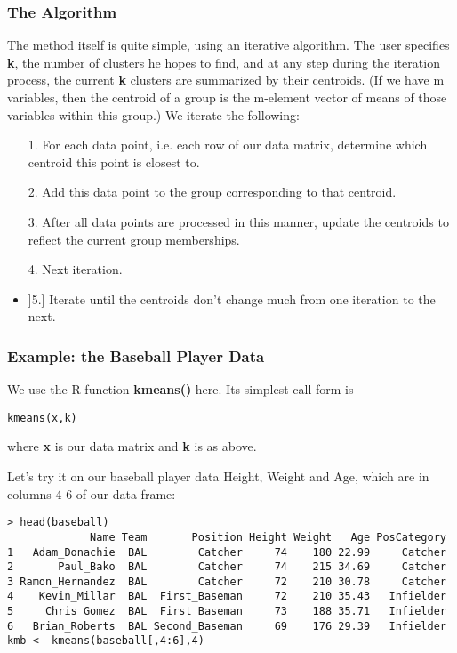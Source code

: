\subsubsection{The Algorithm}

The method itself is quite simple, using an iterative algorithm.  The
user specifies {\bf k}, the number of clusters he hopes to find, and at
any step during the iteration process, the current {\bf k} clusters are
summarized by their centroids.  (If we have m variables, then the
centroid of a group is the m-element vector of means of those variables
within this group.)  We iterate the following:

\begin{itemize}

\item [1.]  For each data point, i.e. each row of our data matrix,
determine which centroid this point is closest to.

\item [2.]  Add this data point to the group corresponding to that
centroid.

\item [3.]  After all data points are processed in this manner, update
the centroids to reflect the current group memberships.

\item [4.]  Next iteration.

\item ]5.]  Iterate until the centroids don't change much from one
iteration to the next.

\end{itemize}

\subsubsection{Example:  the Baseball Player Data}

We use the R function {\bf kmeans()} here.  Its simplest call form is

\begin{lstlisting}
kmeans(x,k)
\end{lstlisting}

where {\bf x} is our data matrix and {\bf k} is as above.

Let's try it on our baseball player data Height, Weight and Age, which
are in columns 4-6 of our data frame:

\begin{lstlisting}
> head(baseball)
             Name Team       Position Height Weight   Age PosCategory 
1   Adam_Donachie  BAL        Catcher     74    180 22.99     Catcher 
2       Paul_Bako  BAL        Catcher     74    215 34.69     Catcher 
3 Ramon_Hernandez  BAL        Catcher     72    210 30.78     Catcher 
4    Kevin_Millar  BAL  First_Baseman     72    210 35.43   Infielder 
5     Chris_Gomez  BAL  First_Baseman     73    188 35.71   Infielder 
6   Brian_Roberts  BAL Second_Baseman     69    176 29.39   Infielder 
kmb <- kmeans(baseball[,4:6],4)
\end{lstlisting}

